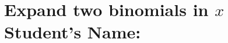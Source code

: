 \documentclass[12pt, a4paper, addpoints]{exam}
\newcommand{\randcoef}{%
    \pgfmathtruncatemacro{\temp}{random(1,5)}\temp
}
\newcommand{\perfectsquare}{%
    (x + \randcoef)(x + \randcoef) %
}
\newcommand{\differenceofsquares}{%
    (x + \randcoef)(x - \randcoef) %
}
\newcommand{\trivialform}{%
    (x + \randcoef)(x + \randcoef) %
}
\newcommand{\generalform}{%
    (\randcoef x + \randcoef)(\randcoef x + \randcoef) %
}
\begin{document}
\section*{Expand two binomials in \( x \)    \quad  Student's Name: \underline{\hspace{5cm}}}

\begin{questions}
\LARGE

\question
\setlength{\columnsep}{20pt}
\begin{multicols}{2}
\begin{parts}
    \part  \( \perfectsquare \)   \ps
    \part  \( \perfectsquare \)   \ps
\end{parts}
\end{multicols}

\question
\setlength{\columnsep}{20pt}
\begin{multicols}{2}
\begin{parts}
    \part  \( \differenceofsquares \)   \ps
    \part  \( \differenceofsquares \)   \ps
\end{parts}
\end{multicols}

\question
\setlength{\columnsep}{20pt}
\begin{multicols}{2}
\begin{parts}
    \part  \( \trivialform \)   \ps
    \part  \( \trivialform \)   \ps
\end{parts}
\end{multicols}

\question
\setlength{\columnsep}{20pt}
\begin{multicols}{2}
\begin{parts}
    \part  \( \generalform \)   \ps
    \part  \( \generalform \)   \ps
\end{parts}
\end{multicols}

\end{questions}
\end{document}
